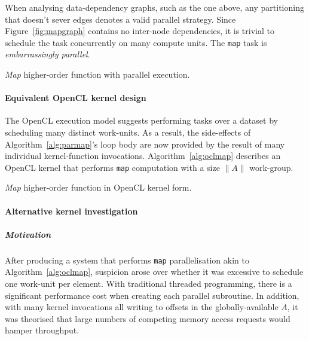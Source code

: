 When analysing data-dependency graphs, such as the one above, any partitioning that doesn't sever edges denotes a valid parallel strategy. Since Figure~\ref{fig:mapgraph} contains no inter-node dependencies, it is trivial to schedule the task concurrently on many compute units. The \verb|map| task is \emph{embarrassingly parallel}.

\begin{algorithm}
  \caption{\emph{Map} higher-order function with parallel execution.}
  \label{alg:parmap}

  \begin{algorithmic}
      \EndPFor
    \EndFunction
  \end{algorithmic}
\end{algorithm}

\paragraph*{Equivalent \ac{OpenCL} kernel design}
The \ac{OpenCL} execution model suggests performing tasks over a dataset by scheduling many distinct work-units. As a result, the side-effects of Algorithm~\ref{alg:parmap}'s loop body are now provided by the result of many individual kernel-function invocations. Algorithm~\ref{alg:oclmap} describes an \ac{OpenCL} kernel that performs \verb|map| computation with a size $\|A\|$ work-group.

\begin{algorithm}
  \caption{\emph{Map} higher-order function in OpenCL kernel form.}
  \label{alg:oclmap}

  \begin{algorithmic}

    \EndFunction
  \end{algorithmic}
\end{algorithm}

\paragraph*{Alternative kernel investigation}
\subparagraph*{Motivation}
After producing a system that performs \verb|map| parallelisation akin to Algorithm~\ref{alg:oclmap}, suspicion arose over whether it was excessive to schedule one work-unit per element. With traditional threaded programming, there is a significant performance cost when creating each parallel subroutine. In addition, with many kernel invocations all writing to offsets in the globally-available $A$, it was theorised that large numbers of competing memory access requests would hamper throughput.

